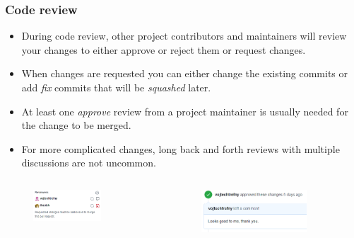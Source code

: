 \documentclass[aspectratio=169]{beamer}              %
\begin{document}
\begin{frame}
	\frametitle{Code review}
	
\begin{block}{}
		\begin{itemize}
			\item During code review, other project contributors and maintainers will review your changes to either approve or reject them or request changes.
			\item When changes are requested you can either change the existing commits or add \emph{fix} commits that will be \emph{squashed} later.
			\item At least one \emph{approve} review from a project maintainer is usually needed for the change to be merged.
			\item For more complicated changes, long back and forth reviews with multiple discussions are not uncommon.
		\end{itemize}
\end{block}

\begin{columns}
\begin{column}{0.4\textwidth}
\begin{figure}[ht!]
	\begin{center}
  	  \includegraphics[width=0.7\textwidth]{img/gh-reviewers.png}
	\end{center}
\end{figure}
\end{column}

\begin{column}{0.4\textwidth}
\begin{figure}[ht!]
	\begin{center}
  	  \includegraphics[width=0.8\textwidth]{img/gh-review-approve.png}
	\end{center}
\end{figure}
\end{column}
\end{columns}

\end{frame}
\end{document}

